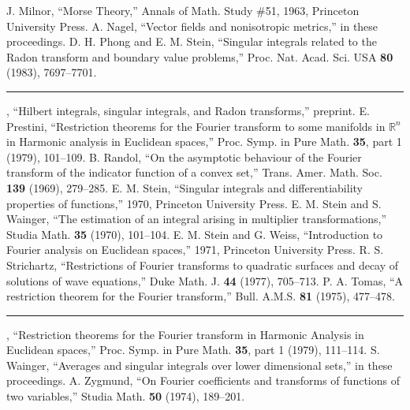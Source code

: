 \documentclass[
  BookTitleCN={傅里叶分析中的振动积分},
  BookTitleEN={Oscillatory Integrals in Fourier Analysis},
  OriginalAuthor={E.~M. Stein},
  OriginalEdition={Proc. Sympos. Pure Math. 35, Part~1},
  OriginalPublisher={American Mathematical Society},
  OriginalYear={1979},
  Translator={翻译及重排},
  ModelUsed={Codex CLI},
  Biblatex=false,
  TranslationDate={2026年8月27日}
]{mathtranslation}
\numberwithin{equation}{chapter}   %
\newcommand{\R}{\mathbb{R}}
\begin{document}
\begin{thebibliography}{33}
 J. Milnor, ``Morse Theory,'' Annals of Math. Study \#51, 1963, Princeton University Press.
 A. Nagel, ``Vector fields and nonisotropic metrics,'' in these proceedings.
 D. H. Phong and E. M. Stein, ``Singular integrals related to the Radon transform and boundary value problems,'' Proc. Nat. Acad. Sci. USA \textbf{80} (1983), 7697--7701.
 \hspace{0.5em}\rule[0.4ex]{1.4em}{0.4pt}, ``Hilbert integrals, singular integrals, and Radon transforms,'' preprint.
 E. Prestini, ``Restriction theorems for the Fourier transform to some manifolds in $\R^{n}$ in Harmonic analysis in Euclidean spaces,'' Proc. Symp. in Pure Math. \textbf{35}, part 1 (1979), 101--109.
 B. Randol, ``On the asymptotic behaviour of the Fourier transform of the indicator function of a convex set,'' Trans. Amer. Math. Soc. \textbf{139} (1969), 279--285.
 E. M. Stein, ``Singular integrals and differentiability properties of functions,'' 1970, Princeton University Press.
 E. M. Stein and S. Wainger, ``The estimation of an integral arising in multiplier transformations,'' Studia Math. \textbf{35} (1970), 101--104.
 E. M. Stein and G. Weiss, ``Introduction to Fourier analysis on Euclidean spaces,'' 1971, Princeton University Press.
 R. S. Strichartz, ``Restrictions of Fourier transforms to quadratic surfaces and decay of solutions of wave equations,'' Duke Math. J. \textbf{44} (1977), 705--713.
 P. A. Tomas, ``A restriction theorem for the Fourier transform,'' Bull. A.M.S. \textbf{81} (1975), 477--478.
 \hspace{0.5em}\rule[0.4ex]{1.4em}{0.4pt}, ``Restriction theorems for the Fourier transform in Harmonic Analysis in Euclidean spaces,'' Proc. Symp. in Pure Math. \textbf{35}, part 1 (1979), 111--114.
 S. Wainger, ``Averages and singular integrals over lower dimensional sets,'' in these proceedings.
 A. Zygmund, ``On Fourier coefficients and transforms of functions of two variables,'' Studia Math. \textbf{50} (1974), 189--201.
\end{thebibliography}
\end{document}
